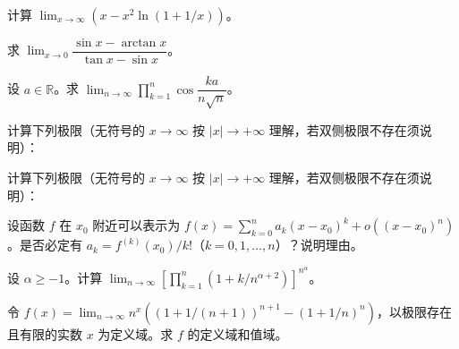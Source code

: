 \newpage
\noindent\begin{minipage}{\textwidth}
计算 $\lim_{x\to\infty}\left(x-x^2\ln(1+1/x)\right)$。
\end{minipage}\par\vfill
\noindent\begin{minipage}{\textwidth}
求 $\lim_{x\to0}\dfrac{\sin x-\arctan x}{\tan x-\sin x}$。
\end{minipage}\par\vfill
\noindent\begin{minipage}{\textwidth}
设 $a\in\mathbb R$。求 $\lim_{n\to\infty}\prod_{k=1}^n\cos\dfrac{ka}{n\sqrt n}$。
\end{minipage}\par\vfill
\newpage
\noindent\begin{minipage}{\textwidth}
计算下列极限（无符号的 $x\to\infty$ 按 $|x|\to+\infty$ 理解，若双侧极限不存在须说明）：
\end{minipage}\par\vfill
\noindent\begin{minipage}{\textwidth}
计算下列极限（无符号的 $x\to\infty$ 按 $|x|\to+\infty$ 理解，若双侧极限不存在须说明）：
\end{minipage}\par\vfill
\noindent\begin{minipage}{\textwidth}
设函数 $f$ 在 $x_0$ 附近可以表示为 $f(x)=\sum_{k=0}^n a_k(x-x_0)^k+o((x-x_0)^n)$。是否必定有 $a_k=f^{(k)}(x_0)/k!$（$k=0,1,\ldots,n$）？说明理由。
\end{minipage}\par\vfill
\newpage
\noindent\begin{minipage}{\textwidth}
设 $\alpha\ge-1$。计算 $\lim_{n\to\infty}\left[\prod_{k=1}^n(1+k/n^{\alpha+2})\right]^{n^\alpha}$。
\end{minipage}\par\vfill
\noindent\begin{minipage}{\textwidth}
令 $f(x)=\lim_{n\to\infty}n^x\left((1+1/(n+1))^{n+1}-(1+1/n)^n\right)$，以极限存在且有限的实数 $x$ 为定义域。求 $f$ 的定义域和值域。
\end{minipage}\par\vfill
